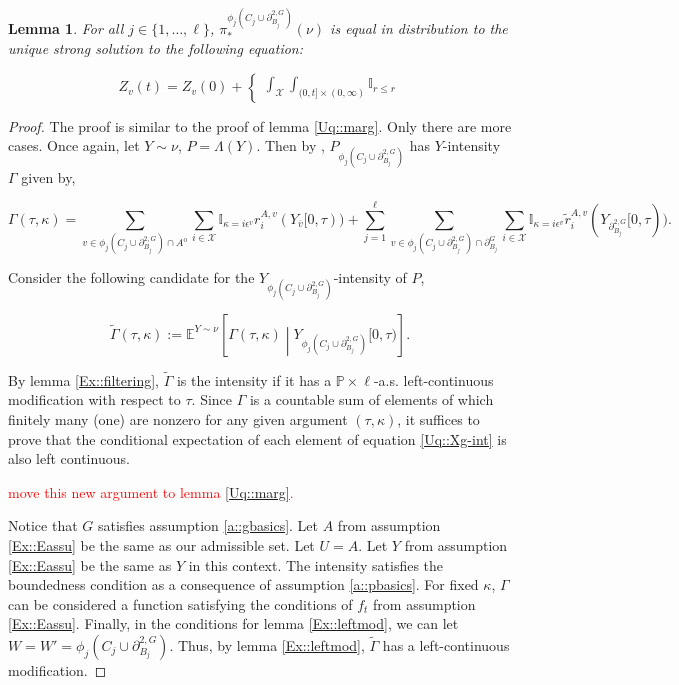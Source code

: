 \documentclass[12pt]{article}
\newcommand{\mb}{\mathbb}
\newcommand{\mc}{\mathcal}
\newcommand{\ov}{\overline}
\newcommand{\ep}{\epsilon}
\newcommand{\tr}{\textcolor{red}}
\newcommand{\ind}{\hspace{24pt}}
\newcommand{\pr}{\mb{P}}							%
\newcommand{\exmu}[2]{\mb{E}^{#1}\left[#2\right]}	%
\newcommand{\defeq}{:=}								%
\newcommand{\sta}{\mc{X}}							%
\newcommand{\gneigh}[2]{\partial^{#1}_{#2}}			%
\newcommand{\dgneigh}[2]{\partial^{2,#1}_{#2}}		%
\newcommand{\cl}[1]{\ov{#1}}						%
\newcommand{\Sm}{\ell}								%
\newcommand{\rate}{r}								%
\newcommand{\proj}{\pi}								%
\newcommand{\vind}[1]{_{#1}}						%
\newcommand{\tme}[1]{(#1)}							%
\newcommand{\tmi}[1]{#1}							%
\newcommand{\vpara}[1]{^{#1}}						%
\newcommand{\stpara}[1]{_{#1}}						%
\newcommand{\gvpara}[2]{^{#1,#2}}					%
\newcommand{\psf}{_*}								%
\newcommand{\psize}{\ell}							%
\newcommand{\Xg}{Y}									%
\newcommand{\brate}{\alt{\rate}}					%
\newcommand{\inte}[1]{{#1}^\mathrm{o}}				%
\newcommand{\alt}[1]{\tilde{#1}}					%
\newcommand{\pmap}{\Lambda}							%
\newcommand{\rt}{\tau}								%
\renewcommand{\mark}{\kappa}						%
\newcommand{\ratee}{\Gamma}							%
\newcommand{\cratee}{\alt{\ratee}}					%
\newcommand{\rp}{P}									%
\newcommand{\mm}{\nu}								%
\newcommand{\ev}[1]{\ep^{#1}}						%
\newcommand{\Xh}{Z}									%
\newtheorem{lem}[thms]{Lemma}
\begin{document}
\begin{lem}
For all \(j \in \{1,\dots,\psize\}\), \(\proj\psf\vpara{\phi_j\left(C_j\cup\dgneigh{G}{B_j}\right)}(\mm)\) is equal in distribution to the unique strong solution to the following equation:

\begin{equation}
\Xh\vind{v}\tme{t} = \Xh\vind{v}\tme{0} + \begin{cases}
\int_\sta\int_{(0,t]\times(0,\infty)} \mb{I}_{r \leq \rate}
\end{cases}
\label{Uq::marg2eqn}
\end{equation}
\label{Uq::marg2}
\end{lem}
\begin{proof}
The proof is similar to the proof of lemma \ref{Uq::marg}. Only there are more cases. Once again, let \(\Xg \sim \mm\), \(\rp = \pmap(\Xg)\). Then by \cite[Exercise 14.7.1]{DalVer08}, \(\rp\vind{\phi_j\left(C_j\cup\dgneigh{G}{B_j}\right)}\) has \(\Xg\)-intensity \(\ratee\) given by,

\begin{equation}
\ratee(\rt,\mark) = \sum_{v \in\phi_j\left(C_j\cup\dgneigh{G}{B_j}\right)\cap\inte{A}} \sum_{i \in \sta} \mb{I}_{\mark = i\ev{v}} \rate\gvpara{A}{v}\stpara{i}(\Xg\vind{\cl{v}}\tmi{[0,\rt)}) + \sum_{j = 1}^\psize\sum_{v \in \phi_j\left(C_j\cup\dgneigh{G}{B_j}\right)\cap\gneigh{G}{B_j}}\sum_{i\in \sta} \mb{I}_{\mark = i\ev{v}} \brate\gvpara{A}{v}\stpara{i}(\Xg\vind{\dgneigh{G}{B_j}}\tmi{[0,\rt)}).
\label{Uq::Xg-int2}
\end{equation}

Consider the following candidate for the \(\Xg\vind{\phi_j\left(C_j\cup\dgneigh{G}{B_j}\right)}\)-intensity of \(\rp\), 

\[\cratee(\rt,\mark) \defeq \exmu{\Xg \sim \mm}{\ratee(\rt,\mark)\middle|\Xg\vind{\phi_j\left(C_j\cup\dgneigh{G}{B_j}\right)}\tmi{[0,\rt)}}.\]

By lemma \ref{Ex::filtering}, \(\cratee\) is the intensity if it has a \(\pr\times\Sm\)-a.s. left-continuous modification with respect to \(\rt\). Since \(\ratee\) is a countable sum of elements of which finitely many (one) are nonzero for any given argument \((\rt,\mark)\), it suffices to prove that the conditional expectation of each element of equation \eqref{Uq::Xg-int} is also left continuous. 

\ind \tr{move this new argument to lemma \ref{Uq::marg}.}

\ind Notice that \(G\) satisfies assumption \ref{a::gbasics}. Let \(A\) from assumption \ref{Ex::Eassu} be the same as our admissible set. Let \(U = A\). Let \(\Xg\) from assumption \ref{Ex::Eassu} be the same as \(\Xg\) in this context. The intensity satisfies the boundedness condition as a consequence of assumption \ref{a::pbasics}. For fixed \(\kappa\), \(\ratee\) can be considered a function satisfying the conditions of \(f_t\) from assumption \ref{Ex::Eassu}. Finally, in the conditions for lemma \ref{Ex::leftmod}, we can let \(W = W' = \phi_j\left(C_j\cup\dgneigh{G}{B_j}\right)\). Thus, by lemma \ref{Ex::leftmod}, \(\cratee\) has a left-continuous modification.


\end{proof}
\end{document}
